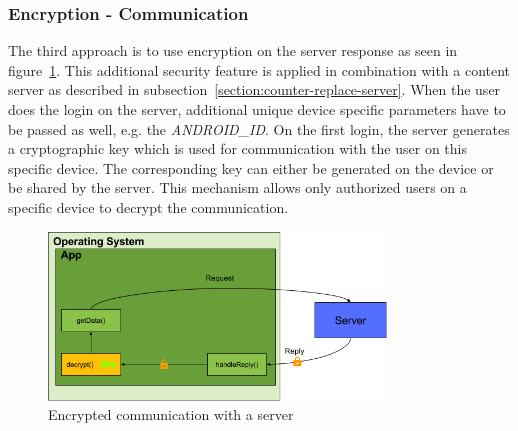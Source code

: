 \subsubsection{Encryption - Communication} \label{section:counter-replace-encryption-content-communication}
The third approach is to use encryption on the server response as seen in figure~\ref{fig:encryptionComm}.
This additional security feature is applied in combination with a content server as described in subsection~\ref{section:counter-replace-server}.
\newline
When the user does the login on the server, additional unique device specific parameters have to be passed as well, e.g. the \textit{ANDROID\_ID}.
On the first login, the server generates a cryptographic key which is used for communication with the user on this specific device.
The corresponding key can either be generated on the device or be shared by the server.
This mechanism allows only authorized users on a specific device to decrypt the communication.
\newline
\begin{figure}[h]
    \centering
    \includegraphics[width=0.8\textwidth]{data/encryptionComm.png}
    \caption{Encrypted communication with a server}
    \label{fig:encryptionComm}
\end{figure}
